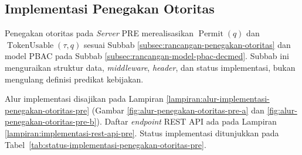 \subsection{Implementasi Penegakan Otoritas}
\label{subsec:implementasi-penegakan-otoritas-pre}

Penegakan otoritas pada \textit{Server} PRE merealisasikan $\operatorname{Permit}(q)$ dan $\operatorname{TokenUsable}(\tau,q)$ sesuai Subbab \ref{subsec:rancangan-penegakan-otoritas} dan model PBAC pada Subbab \ref{subsec:rancangan-model-pbac-decmed}. Subbab ini menguraikan struktur data, \textit{middleware}, \textit{header}, dan status implementasi, bukan mengulang definisi predikat kebijakan.

Alur implementasi disajikan pada Lampiran \ref{lampiran:alur-implementasi-penegakan-otoritas-pre} (Gambar \ref{fig:alur-penegakan-otoritas-pre-a} dan \ref{fig:alur-penegakan-otoritas-pre-b}). Daftar \textit{endpoint} REST API ada pada Lampiran \ref{lampiran:implementasi-rest-api-pre}. Status implementasi ditunjukkan pada Tabel~\ref{tab:status-implementasi-penegakan-otoritas-pre}.

